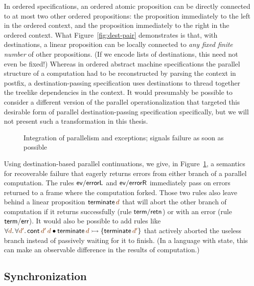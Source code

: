 In ordered specifications, an ordered atomic proposition can be
directly connected to at most two other ordered propositions: the
proposition immediately to the left in the ordered context, and the
proposition immediately to the right in the ordered context. What
Figure~\ref{fig:dest-pair} demonstrates is that, with destinations, a
linear proposition can be locally connected to {\it any fixed finite
  number} of other propositions. (If we encode lists of
  destinations, this need not even be fixed!) Whereas in ordered
abstract machine specifications the parallel structure of a
computation had to be reconstructed by parsing the context in postfix,
a destination-passing specification uses destinations to thread
together the treelike dependencies in the context. It would presumably
be possible to consider a different version of the parallel
operationalization that targeted this desirable form of parallel
destination-passing specification specifically, but we will not
present such a transformation in this thesis.

\begin{figure}
\caption{Integration of parallelism and exceptions; signals failure as
  soon as possible}
\label{fig:dest-fail-paror}
\end{figure}

Using destination-based parallel continuations, we give, in
Figure~\ref{fig:dest-fail-paror}, a semantics for recoverable failure
that eagerly returns errors from either branch of a parallel
computation. The rules ${\sf ev/errorL}$ and ${\sf ev/errorR}$
immediately pass on errors returned to a frame where the computation
forked.  Those two rules also leave behind a linear proposition ${\sf
  terminate}\,\lf{d}$ that will abort the other branch of computation if it
returns successfully (rule ${\sf term/retn}$) or with an error (rule
${\sf term/err}$). It would also be possible to add rules
like $\forall \lf{d}.\,\forall\lf{d'}.\,{\sf cont}\,\lf{d'}\,\lf{d} \fuse {\sf terminate}\,\lf{d} \lefti \{ {\sf
  terminate}\,\lf{d'} \}$ that actively aborted the useless branch instead
of passively waiting for it to finish. (In a language with state, this 
can make an observable difference in the results of computation.)

\subsection{Synchronization}
\label{sec:dest-synch}

